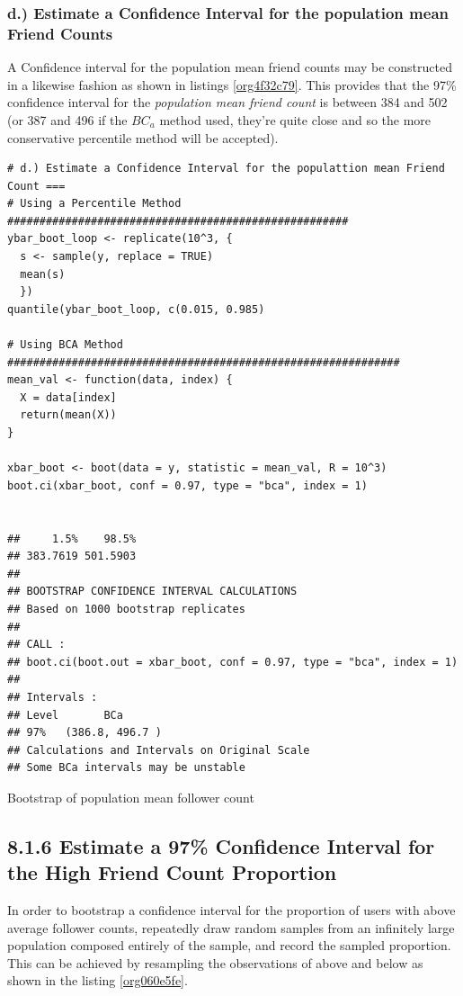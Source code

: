 \documentclass[11pt]{article}
\begin{document}
\subsubsection{d.) Estimate a Confidence Interval for the population mean Friend Counts}
\label{sec:org49048d3}
A Confidence interval for the population mean friend counts may be constructed
in a likewise fashion as shown in listings \ref{org4f32c79}. This provides that the 97\%
confidence interval for the \emph{population mean friend count} is between 384 and 502
(or 387 and 496 if the \(BC_{a}\) method used, they're quite close and so the more
conservative percentile method will be accepted).

\begin{listing}[htbp]
\begin{verbatim}
# d.) Estimate a Confidence Interval for the populattion mean Friend Count ===
# Using a Percentile Method #####################################################
ybar_boot_loop <- replicate(10^3, {
  s <- sample(y, replace = TRUE)
  mean(s)
  })
quantile(ybar_boot_loop, c(0.015, 0.985)

# Using BCA Method #############################################################
mean_val <- function(data, index) {
  X = data[index]
  return(mean(X))
}

xbar_boot <- boot(data = y, statistic = mean_val, R = 10^3)
boot.ci(xbar_boot, conf = 0.97, type = "bca", index = 1)


##     1.5%    98.5%
## 383.7619 501.5903
##
## BOOTSTRAP CONFIDENCE INTERVAL CALCULATIONS
## Based on 1000 bootstrap replicates
##
## CALL :
## boot.ci(boot.out = xbar_boot, conf = 0.97, type = "bca", index = 1)
##
## Intervals :
## Level       BCa
## 97%   (386.8, 496.7 )
## Calculations and Intervals on Original Scale
## Some BCa intervals may be unstable
\end{verbatim}
\caption{\label{org4f32c79}Bootstrap of population mean follower count}
\end{listing}

\subsection{8.1.6 Estimate a 97\% Confidence Interval for the High Friend Count Proportion}
\label{sec:org06ceb07}
In order to bootstrap a confidence interval for the proportion of users with
above average follower counts, repeatedly draw random samples from an infinitely
large population composed entirely of the sample, and record the sampled
proportion. This can be achieved by resampling the observations of above and
below as shown in the listing \ref{org060e5fe}.
\end{document}
